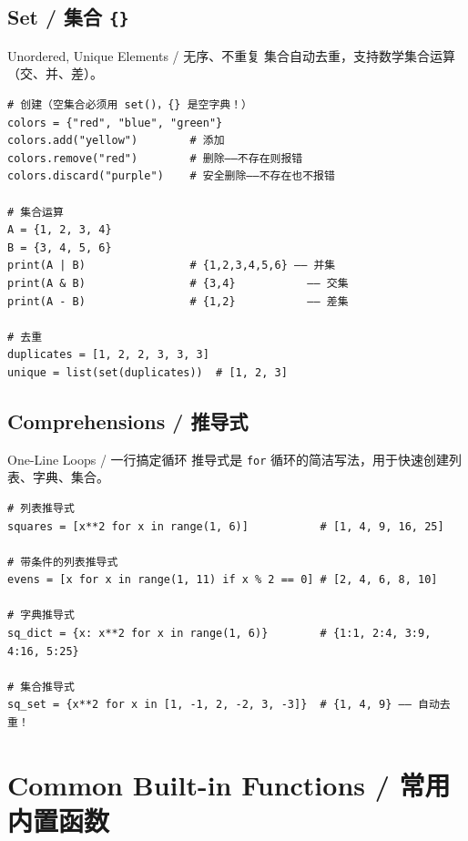 \documentclass[11pt,a4paper]{report}
\let\oldtexttt\texttt
\renewcommand{\texttt}[1]{\textcolor{mainblue}{\oldtexttt{#1}}}
\begin{document}
\section{Set / 集合 \texttt{\{\}}}

\begin{concept}{Unordered, Unique Elements / 无序、不重复}
集合自动去重，支持数学集合运算（交、并、差）。
\begin{lstlisting}
# 创建（空集合必须用 set()，{} 是空字典！）
colors = {"red", "blue", "green"}
colors.add("yellow")        # 添加
colors.remove("red")        # 删除——不存在则报错
colors.discard("purple")    # 安全删除——不存在也不报错

# 集合运算
A = {1, 2, 3, 4}
B = {3, 4, 5, 6}
print(A | B)                # {1,2,3,4,5,6} —— 并集
print(A & B)                # {3,4}           —— 交集
print(A - B)                # {1,2}           —— 差集

# 去重
duplicates = [1, 2, 2, 3, 3, 3]
unique = list(set(duplicates))  # [1, 2, 3]
\end{lstlisting}
\end{concept}

\section{Comprehensions / 推导式}

\begin{concept}{One-Line Loops / 一行搞定循环}
推导式是 \texttt{for} 循环的简洁写法，用于快速创建列表、字典、集合。
\begin{lstlisting}
# 列表推导式
squares = [x**2 for x in range(1, 6)]           # [1, 4, 9, 16, 25]

# 带条件的列表推导式
evens = [x for x in range(1, 11) if x % 2 == 0] # [2, 4, 6, 8, 10]

# 字典推导式
sq_dict = {x: x**2 for x in range(1, 6)}        # {1:1, 2:4, 3:9, 4:16, 5:25}

# 集合推导式
sq_set = {x**2 for x in [1, -1, 2, -2, 3, -3]}  # {1, 4, 9} —— 自动去重！
\end{lstlisting}
\end{concept}

\newpage

\chapter{Common Built-in Functions / 常用内置函数}
\end{document}
